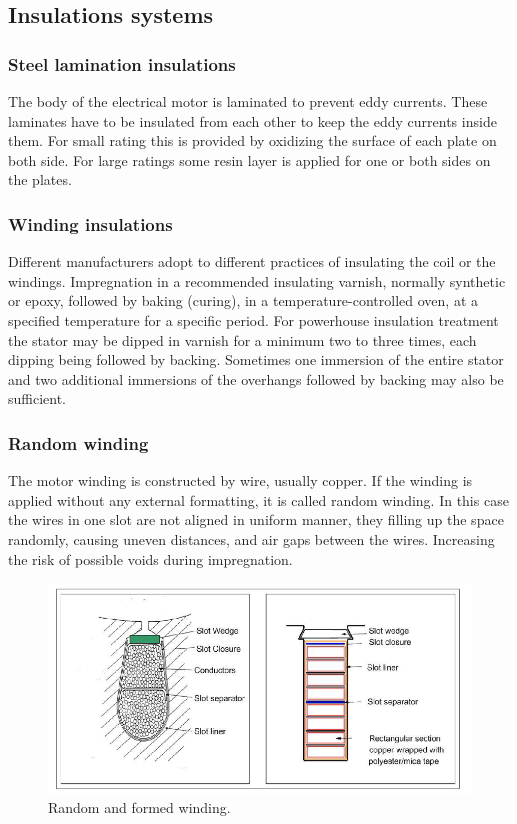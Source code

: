 \subsection{Insulations systems}
\subsubsection{Steel lamination insulations}
The body of the electrical motor is laminated to prevent eddy currents. These laminates have to be insulated from each other to keep the eddy currents inside them. For small rating this is provided by oxidizing the surface of each plate on both side. For large ratings some resin layer is applied for one or both sides on the plates.

\subsubsection{Winding insulations}

Different manufacturers adopt to different practices of insulating the coil or the windings. Impregnation in a recommended insulating varnish, normally synthetic or epoxy, followed by baking (curing), in a temperature-controlled oven, at a specified temperature for a specific period.
For powerhouse insulation treatment the stator may be dipped in varnish for a minimum two to three times, each dipping being followed by backing. Sometimes one immersion of the entire stator and
two additional immersions of the overhangs followed by backing may also be sufficient.

\subsubsection*{Random winding}

The motor winding is constructed by wire, usually copper. If the winding is applied without any external formatting, it is called random winding. In this case the wires in one slot are not aligned in uniform manner, they filling up the space randomly, causing uneven distances, and air gaps between the wires. Increasing the risk of possible voids during impregnation.

\begin{figure}[h]
 \centerline{\includegraphics[width=.85\columnwidth]{.//figures/random_vs_formed.png}}
 \caption{Random and formed winding.}
 \label{fig:rnd vs formed}
\end{figure}

